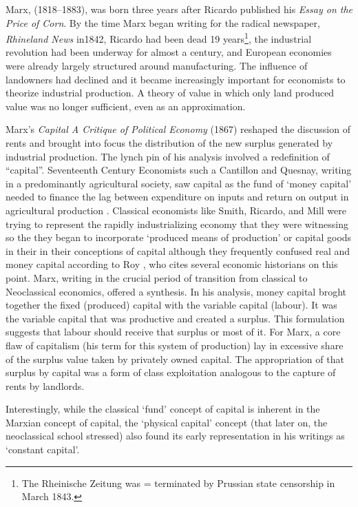 Marx, (1818--1883), was born three years after Ricardo published his \textit{Essay on the Price of Corn}. 
By the time Marx began writing for the radical newspaper, \textit{Rhineland News}  in1842, Ricardo had been dead 19 years\footnote{The Rheinische Zeitung was = terminated by Prussian state censorship in March 1843.}, the industrial revolution had been underway for almost a century, and European economies were already largely structured around manufacturing. The influence of landowners had declined and it became increasingly important for economists to theorize industrial production. A theory of value in which only land produced value was no longer sufficient, even as an approximation.


Marx's \emph{Capital A Critique of Political Economy} 
(1867)\cite{marxKapitalCritiquePolitical1959} reshaped the discussion of rents  and brought into focus the distribution of the new surplus generated by industrial production. The lynch pin of his analysis involved a redefinition of ``capital''.
Seventeenth Century Economists such a Cantillon and Quesnay,  writing in a predominantly agricultural society, saw capital as the fund of ‘money capital’ needed  to finance the lag between expenditure on inputs and return on output  in agricultural production \cite{cannanEarlyHistoryTerm1921, royEvolutionConceptCapital2009}. 
Classical economists like Smith, Ricardo, and Mill were trying to represent the rapidly industrializing economy that they were witnessing so the they began to incorporate ‘produced means of production’ or capital goods in their in their conceptions of capital although they frequently confused real and money capital according to Roy \cite{royEvolutionConceptCapital2009}, who cites several  economic historians on this point. Marx, writing  in the crucial period of transition from classical to Neoclassical economics, offered a  synthesis. In his analysis, money capital broght together the fixed (produced) capital   with the variable capital  (labour). It was the variable capital that was productive and created a surplus. This formulation suggests that labour should receive that surplus or most of it. For Marx, a core flaw of capitalism (his term for this system of production) lay in excessive share of the surplus value taken by privately owned capital. The appropriation of that surplus by capital was a form of class exploitation analogous to the capture of rents by landlords.  

 Interestingly, while the classical ‘fund’ concept of capital is inherent in the Marxian concept of capital, the ‘physical capital’ concept (that later on, the neoclassical school stressed) also found its early representation in his writings as ‘constant capital’.


